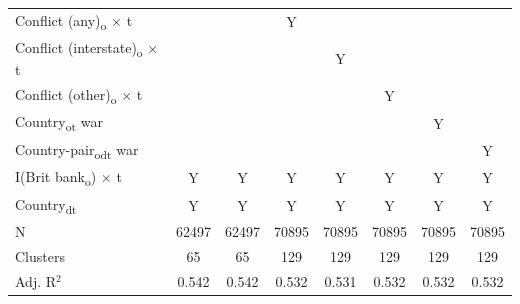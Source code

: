 {\begin{tabular}{l*{7}{c}}
Conflict (any)\textsubscript{o} $\times$ t&               &               &           Y   &               &               &               &               \\
Conflict (interstate)\textsubscript{o} $\times$ t&               &               &               &           Y   &               &               &               \\
Conflict (other)\textsubscript{o} $\times$ t&               &               &               &               &           Y   &               &               \\
Country\textsubscript{ot} war&               &               &               &               &               &           Y   &               \\
Country-pair\textsubscript{odt} war&               &               &               &               &               &               &           Y   \\
I(Brit bank\textsubscript{o}) $\times$ t&           Y   &           Y   &           Y   &           Y   &           Y   &           Y   &           Y   \\
Country\textsubscript{dt}&           Y   &           Y   &           Y   &           Y   &           Y   &           Y   &           Y   \\
\midrule
N           &       62497   &       62497   &       70895   &       70895   &       70895   &       70895   &       70895   \\
Clusters    &          65   &          65   &         129   &         129   &         129   &         129   &         129   \\
Adj. R{$^2$}&       0.542   &       0.542   &       0.532   &       0.531   &       0.532   &       0.532   &       0.532   \\
\bottomrule
\end{tabular}
}
